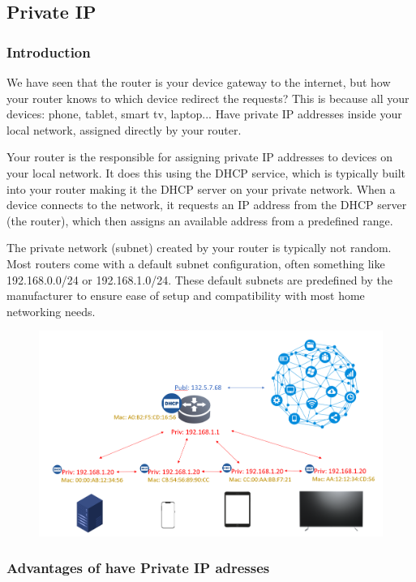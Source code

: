 \documentclass{article}
\begin{document}
\newpage
\subsection{Private IP}

\subsubsection{Introduction}

We have seen that the router is your device gateway to the internet, but how your router knows to which device redirect the requests? This is because all your devices: phone, tablet, smart tv, laptop... Have private IP addresses inside your local network, assigned directly by your router.

Your router is the responsible for assigning private IP addresses to devices on your local network. It does this using the DHCP service, which is typically built into your router making it the DHCP server on your private network. When a device connects to the network, it requests an IP address from the DHCP server (the router), which then assigns an available address from a predefined range.

The private network (subnet) created by your router is typically not random. Most routers come with a default subnet configuration, often something like 192.168.0.0/24 or 192.168.1.0/24. These default subnets are predefined by the manufacturer to ensure ease of setup and compatibility with most home networking needs.

\begin{figure}[H]
    \includegraphics[width=\textwidth]{pictures/network.png}
    \centering
\end{figure}

\subsubsection{Advantages of have Private IP adresses}
\end{document}
